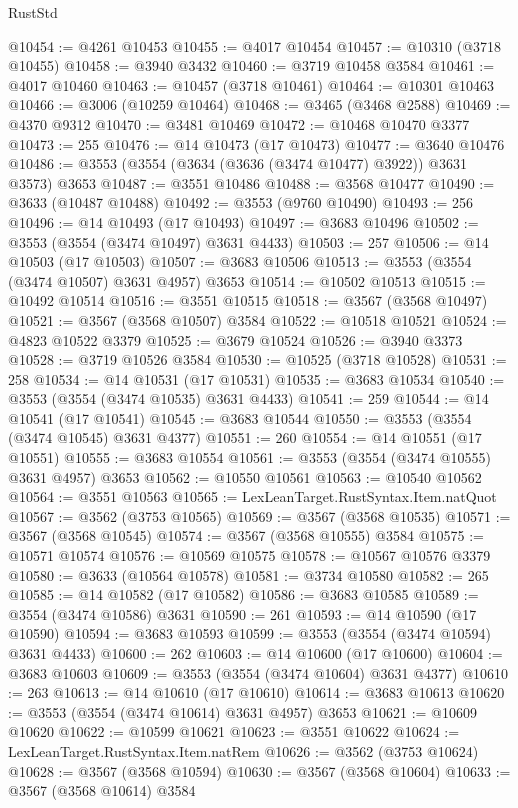 \begin{lexlean}{RustStd}
\begin{coremodule}
@10454 := @4261 @10453
@10455 := @4017 @10454
@10457 := @10310 (@3718 @10455)
@10458 := @3940 @3432
@10460 := @3719 @10458 @3584
@10461 := @4017 @10460
@10463 := @10457 (@3718 @10461)
@10464 := @10301 @10463
@10466 := @3006 (@10259 @10464)
@10468 := @3465 (@3468 @2588)
@10469 := @4370 @9312
@10470 := @3481 @10469
@10472 := @10468 @10470 @3377
@10473 := 255
@10476 := @14 @10473 (@17 @10473)
@10477 := @3640 @10476
@10486 := @3553 (@3554 (@3634 (@3636 (@3474 @10477) @3922)) @3631 @3573) @3653
@10487 := @3551 @10486
@10488 := @3568 @10477
@10490 := @3633 (@10487 @10488)
@10492 := @3553 (@9760 @10490)
@10493 := 256
@10496 := @14 @10493 (@17 @10493)
@10497 := @3683 @10496
@10502 := @3553 (@3554 (@3474 @10497) @3631 @4433)
@10503 := 257
@10506 := @14 @10503 (@17 @10503)
@10507 := @3683 @10506
@10513 := @3553 (@3554 (@3474 @10507) @3631 @4957) @3653
@10514 := @10502 @10513
@10515 := @10492 @10514
@10516 := @3551 @10515
@10518 := @3567 (@3568 @10497)
@10521 := @3567 (@3568 @10507) @3584
@10522 := @10518 @10521
@10524 := @4823 @10522 @3379
@10525 := @3679 @10524
@10526 := @3940 @3373
@10528 := @3719 @10526 @3584
@10530 := @10525 (@3718 @10528)
@10531 := 258
@10534 := @14 @10531 (@17 @10531)
@10535 := @3683 @10534
@10540 := @3553 (@3554 (@3474 @10535) @3631 @4433)
@10541 := 259
@10544 := @14 @10541 (@17 @10541)
@10545 := @3683 @10544
@10550 := @3553 (@3554 (@3474 @10545) @3631 @4377)
@10551 := 260
@10554 := @14 @10551 (@17 @10551)
@10555 := @3683 @10554
@10561 := @3553 (@3554 (@3474 @10555) @3631 @4957) @3653
@10562 := @10550 @10561
@10563 := @10540 @10562
@10564 := @3551 @10563
@10565 := LexLeanTarget.RustSyntax.Item.natQuot
@10567 := @3562 (@3753 @10565)
@10569 := @3567 (@3568 @10535)
@10571 := @3567 (@3568 @10545)
@10574 := @3567 (@3568 @10555) @3584
@10575 := @10571 @10574
@10576 := @10569 @10575
@10578 := @10567 @10576 @3379
@10580 := @3633 (@10564 @10578)
@10581 := @3734 @10580
@10582 := 265
@10585 := @14 @10582 (@17 @10582)
@10586 := @3683 @10585
@10589 := @3554 (@3474 @10586) @3631
@10590 := 261
@10593 := @14 @10590 (@17 @10590)
@10594 := @3683 @10593
@10599 := @3553 (@3554 (@3474 @10594) @3631 @4433)
@10600 := 262
@10603 := @14 @10600 (@17 @10600)
@10604 := @3683 @10603
@10609 := @3553 (@3554 (@3474 @10604) @3631 @4377)
@10610 := 263
@10613 := @14 @10610 (@17 @10610)
@10614 := @3683 @10613
@10620 := @3553 (@3554 (@3474 @10614) @3631 @4957) @3653
@10621 := @10609 @10620
@10622 := @10599 @10621
@10623 := @3551 @10622
@10624 := LexLeanTarget.RustSyntax.Item.natRem
@10626 := @3562 (@3753 @10624)
@10628 := @3567 (@3568 @10594)
@10630 := @3567 (@3568 @10604)
@10633 := @3567 (@3568 @10614) @3584

\end{coremodule}
\end{lexlean}
